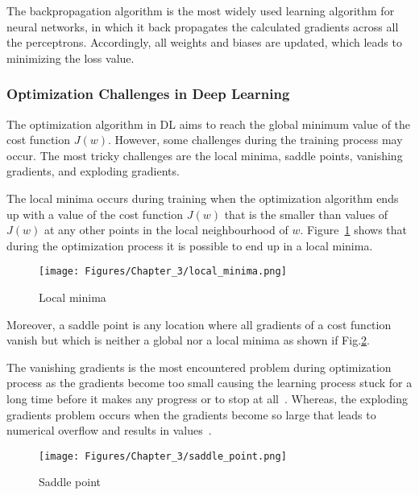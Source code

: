 The backpropagation algorithm is the most widely used learning algorithm for neural networks, in which it back propagates the calculated gradients across all the perceptrons.
Accordingly, all weights and biases are updated, which leads to minimizing the loss value.
\subsubsection{Optimization Challenges in Deep Learning}
The optimization algorithm in DL aims to reach the global minimum value of the cost function \(J(w)\).
However, some challenges during the training process may occur.
The most tricky challenges are the local minima, saddle points, vanishing gradients, and exploding gradients.

The local minima occurs during training when the optimization algorithm ends up with a value of the cost function \(J(w)\) that is the smaller than values of \(J(w)\) at any other points in the local neighbourhood of \(w\).
Figure~\ref{fig:local_minima} shows that during the optimization process it is possible to end up in a local minima.
\begin{figure}[!ht]
	\begin{center}
		\centering
		\texttt{[image: Figures/Chapter\_3/local\_minima.png]}
	\end{center}
	\caption{Local minima} 
	\label{fig:local_minima}
\end{figure}

Moreover, a saddle point is any location where all gradients of a cost function vanish but which is neither a global nor a local minima as shown if Fig.\ref{fig:saddle_point}.

The vanishing gradients is the most encountered problem during optimization process as the gradients become too small causing the learning process stuck for a long time  before it makes any progress or to stop at all~\cite{Brownlee2017a}.
Whereas, the exploding gradients problem occurs when the gradients become so large that leads to numerical overflow and results in  values~\cite{Brownlee2017a}.
\begin{figure}[!ht]
	\begin{center}
		\centering
		\texttt{[image: Figures/Chapter\_3/saddle\_point.png]}
	\end{center}
	\caption{Saddle point} 
	\label{fig:saddle_point}
\end{figure}
